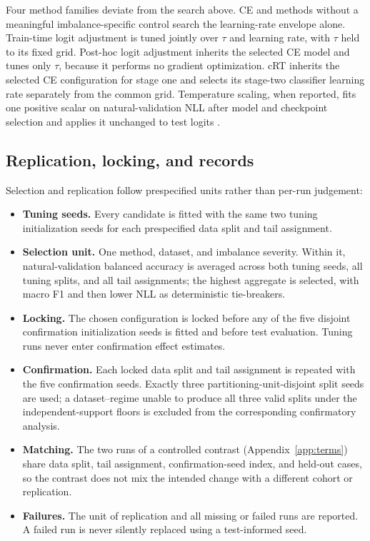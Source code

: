 \documentclass[11pt]{article}
\begin{document}
Four method families deviate from the search above. CE and methods without a meaningful imbalance-specific control search the learning-rate envelope alone. Train-time logit adjustment is tuned jointly over $\tau$ and learning rate, with $\tau$ held to its fixed grid. Post-hoc logit adjustment inherits the selected CE model and tunes only $\tau$, because it performs no gradient optimization. cRT inherits the selected CE configuration for stage one and selects its stage-two classifier learning rate separately from the common grid. Temperature scaling, when reported, fits one positive scalar on natural-validation NLL after model and checkpoint selection and applies it unchanged to test logits \citep{guo2017calibration}.

\subsection{Replication, locking, and records}
Selection and replication follow prespecified units rather than per-run judgement:
\begin{itemize}\setlength{\itemsep}{1pt}
  \item \textbf{Tuning seeds.} Every candidate is fitted with the same two tuning initialization seeds for each prespecified data split and tail assignment.
  \item \textbf{Selection unit.} One method, dataset, and imbalance severity. Within it, natural-validation balanced accuracy is averaged across both tuning seeds, all tuning splits, and all tail assignments; the highest aggregate is selected, with macro F1 and then lower NLL as deterministic tie-breakers.
  \item \textbf{Locking.} The chosen configuration is locked before any of the five disjoint confirmation initialization seeds is fitted and before test evaluation. Tuning runs never enter confirmation effect estimates.
  \item \textbf{Confirmation.} Each locked data split and tail assignment is repeated with the five confirmation seeds. Exactly three partitioning-unit-disjoint split seeds are used; a dataset--regime unable to produce all three valid splits under the independent-support floors is excluded from the corresponding confirmatory analysis.
  \item \textbf{Matching.} The two runs of a controlled contrast (Appendix~\ref{app:terms}) share data split, tail assignment, confirmation-seed index, and held-out cases, so the contrast does not mix the intended change with a different cohort or replication.
  \item \textbf{Failures.} The unit of replication and all missing or failed runs are reported. A failed run is never silently replaced using a test-informed seed.
\end{itemize}
\end{document}
